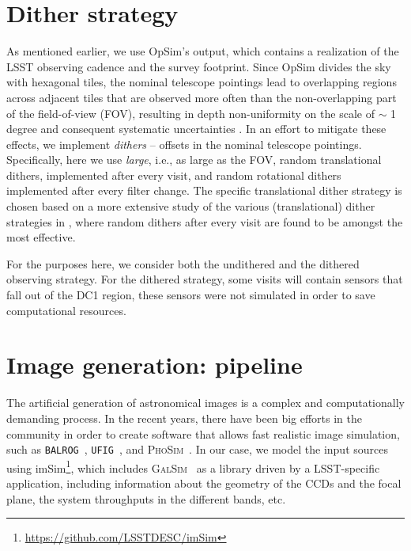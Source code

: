 \documentclass[twocolumn]{aastex62}
\begin{document}
\section{Dither strategy}
\label{sec:dithering}

As mentioned earlier, we use OpSim's output, which contains a realization of the LSST observing cadence and the survey footprint. Since OpSim divides the sky with hexagonal tiles, the nominal telescope pointings lead to overlapping regions across adjacent tiles that are observed more often than the non-overlapping part of the field-of-view (FOV), resulting in depth non-uniformity on the scale of $\sim$ 1 degree and consequent systematic uncertainties \citep{2016ApJ...829...50A}. In an effort to mitigate these effects, we implement \textit{dithers} -- offsets in the nominal telescope pointings. Specifically, here we use \textit{large}, i.e., as large as the FOV, random translational dithers, implemented after every visit, and random rotational dithers implemented after every filter change. The specific translational dither strategy is chosen based on a more extensive study of the various (translational) dither strategies in \citet{2016ApJ...829...50A}, where random dithers after every visit are found to be amongst the most effective.

For the purposes here, we consider both the undithered and the dithered observing strategy. For the dithered strategy, some visits will contain sensors that fall out of the DC1 region, these sensors were not simulated in order to save computational resources.

\section{Image generation: pipeline}
\label{sec:image_generation_pipeline}

The artificial generation of astronomical images is a complex and computationally demanding process. In the recent
years, there have been big efforts in the community in order to create software that allows fast realistic image
simulation, such as \texttt{BALROG}~\citep{2016MNRAS.457..786S}, \texttt{UFIG}~\citep{2016ApJ...817...25B}, and \textsc{PhoSim}~\citep{2015ApJS..218...14P}. In our case, we model the input sources using imSim\footnote{\url{https://github.com/LSSTDESC/imSim}}, which includes \textsc{GalSim}~\citep{2015A&C....10..121R} as a library driven
by a LSST-specific application, including information about the geometry of the CCDs and the focal plane, the system throughputs in the different bands, etc.
\end{document}
